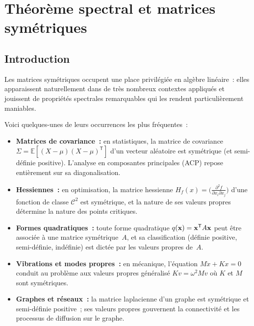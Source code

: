 
\chapter{Théorème spectral et matrices symétriques}\label{ch:theoreme-spectral}

\section*{Introduction}

Les matrices symétriques occupent une place
privilégiée en algèbre linéaire~: elles apparaissent naturellement dans
de très nombreux contextes appliqués et jouissent de propriétés spectrales
remarquables qui les rendent particulièrement maniables.

\medskip

Voici quelques-unes de leurs occurrences les plus fréquentes~:
\begin{itemize}
  \item \textbf{Matrices de covariance~:}
    en statistiques, la matrice de covariance
    $\Sigma = \mathbb{E}[(X-\mu)(X-\mu)^{\mathsf{T}}]$
    d'un vecteur aléatoire est symétrique (et semi-définie positive).
    L'analyse en composantes principales (ACP) repose entièrement sur
    sa diagonalisation.
  \item \textbf{Hessiennes~:} en optimisation, la matrice
    hessienne $H_f(x) = \bigl(\frac{\partial^2 f}{\partial x_i
    \partial x_j}\bigr)$ d'une fonction de classe $\mathcal{C}^2$
    est symétrique, et la nature de ses valeurs propres détermine la
    nature des points critiques.
  \item \textbf{Formes quadratiques~:} toute
    forme quadratique $q(\mathbf{x}) = {\mathbf{x}}^{\mathsf{T}} A \mathbf{x}$
    peut être associée à une matrice symétrique~$A$, et sa classification
    (définie positive, semi-définie, indéfinie) est dictée par les valeurs
    propres de~$A$.
  \item \textbf{Vibrations et modes propres~:} en
    mécanique, l'équation $M\ddot{x} + Kx = 0$ conduit au problème
    aux valeurs propres généralisé $Kv = \omega^2 Mv$ où $K$ et $M$ sont
    symétriques.
  \item \textbf{Graphes et réseaux~:} la
    matrice laplacienne d'un graphe est symétrique et semi-définie positive~;
    ses valeurs propres gouvernent la connectivité et les processus de
    diffusion sur le graphe.
\end{itemize}

